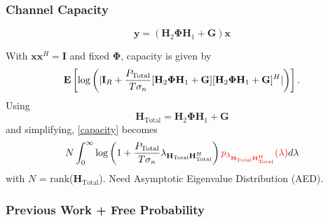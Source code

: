 \documentclass[10pt,tgadventor, onlymath]{beamer}
\begin{document}
\begin{frame}
\frametitle{Channel Capacity}
\begin{equation*}
	\mathbf{y} = (\mathbf{H}_2\boldsymbol{\Phi}\mathbf{H}_1 + \mathbf{G})\mathbf{x}
\end{equation*}

With $\mathbf{x}\mathbf{x}^H = \mathbf{I}$ and fixed $\boldsymbol{\Phi}$, capacity is given by 
\begin{equation*}\label{capacity}
\mathop{\bf E{}}\left[\text{log{}}\left(|\mathbf{I}_{R}+\frac{P_{\text{Total}}}{T \sigma_n}[\mathbf{H}_{2}\boldsymbol{\Phi}\mathbf{H}_{1} + \mathbf{G}][\mathbf{H}_{2}\boldsymbol{\Phi}\mathbf{H}_{1} + \mathbf{G}]^H|\right)\right].
\end{equation*}
Using 
\begin{equation*}
\mathbf{H}_{\text{Total}} = \mathbf{H}_{2}\boldsymbol{\Phi}\mathbf{H}_{1} + \mathbf{G}
\end{equation*}
and simplifying, \eqref{capacity} becomes
\begin{equation*}
N \int_0^{\infty}\text{log{}}\left(1+\frac{P_{\text{Total}}}{T \sigma_n} \lambda_{\mathbf{H}_{\text{Total}}\mathbf{H}_{\text{Total}}^H}\right) \textcolor{red}{p_{\lambda_{\mathbf{H}_{\text{Total}}\mathbf{H}_{\text{Total}}^H}}(\lambda)} d\lambda
\end{equation*}
with $N$ = rank($\mathbf{H}_{\text{Total}}$).
Need Asymptotic Eigenvalue Distribution (AED).
\end{frame}


\subsubsection{Previous Work + Free Probability}
\end{document}
